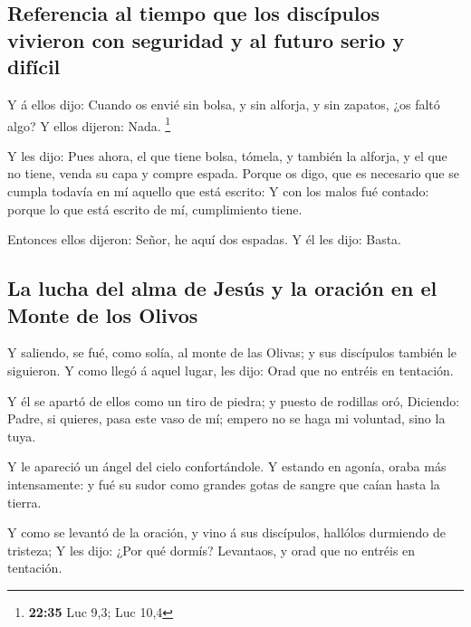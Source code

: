 \hypertarget{referencia-al-tiempo-que-los-discuxedpulos-vivieron-con-seguridad-y-al-futuro-serio-y-difuxedcil}{%
\subsection{Referencia al tiempo que los discípulos vivieron con
seguridad y al futuro serio y
difícil}\label{referencia-al-tiempo-que-los-discuxedpulos-vivieron-con-seguridad-y-al-futuro-serio-y-difuxedcil}}

 Y á ellos dijo: Cuando os envié sin bolsa, y sin
alforja, y sin zapatos, ¿os faltó algo? Y ellos dijeron: Nada.
\footnote{\textbf{22:35} Luc 9,3; Luc 10,4}

 Y les dijo: Pues ahora, el que tiene bolsa, tómela, y
también la alforja, y el que no tiene, venda su capa y compre espada.
 Porque os digo, que es necesario que se cumpla todavía
en mí aquello que está escrito: Y con los malos fué contado: porque lo
que está escrito de mí, cumplimiento tiene.

 Entonces ellos dijeron: Señor, he aquí dos espadas. Y él
les dijo: Basta.

\hypertarget{la-lucha-del-alma-de-jesuxfas-y-la-oraciuxf3n-en-el-monte-de-los-olivos}{%
\subsection{La lucha del alma de Jesús y la oración en el Monte de los
Olivos}\label{la-lucha-del-alma-de-jesuxfas-y-la-oraciuxf3n-en-el-monte-de-los-olivos}}

 Y saliendo, se fué, como solía, al monte de las Olivas;
y sus discípulos también le siguieron.  Y como llegó á
aquel lugar, les dijo: Orad que no entréis en tentación.

 Y él se apartó de ellos como un tiro de piedra; y puesto
de rodillas oró,  Diciendo: Padre, si quieres, pasa este
vaso de mí; empero no se haga mi voluntad, sino la tuya.

 Y le apareció un ángel del cielo confortándole.
 Y estando en agonía, oraba más intensamente: y fué su
sudor como grandes gotas de sangre que caían hasta la tierra.

 Y como se levantó de la oración, y vino á sus
discípulos, hallólos durmiendo de tristeza;  Y les dijo:
¿Por qué dormís? Levantaos, y orad que no entréis en tentación.

